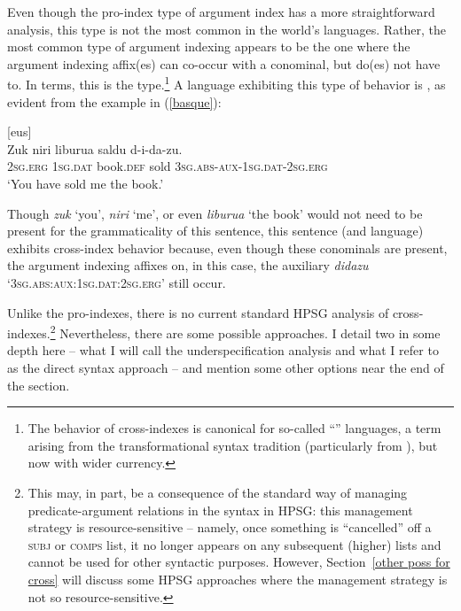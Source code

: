 \documentclass[output=paper
 	        ,biblatex
                ,babelshorthands
                ,newtxmath
                ,draftmode
                ,colorlinks, citecolor=brown
]{langscibook}
\begin{document}
Even though the pro-index type of argument index has a more straightforward analysis, this type is
not the most common in the world's languages. Rather, the most common type of argument indexing
appears to be the one where the argument indexing affix(es) can co-occur with a conominal, but
do(es) not have to.  In 
terms, this is the  type.\footnote{The behavior of cross-indexes is canonical for so-called ``'' languages, a term arising from the transformational syntax tradition (particularly from \citealt[, Section~4.3]{Chomsky81a}), but now with wider currency.} A language exhibiting this type of behavior is , as evident from the example in (\ref{basque}):    
%
\begin{samepage}
\begin{exe}
\ex\label{basque}  [eus] \citep[98]{laka96} \\
\gll Zuk niri liburua saldu d-i-da-zu. \\
\textsc{2sg.erg} \textsc{1sg.dat} book.\textsc{def} sold \textsc{3sg.abs}-\textsc{aux}-\textsc{1sg.dat}-\textsc{2sg.erg} \\
\glt `You have sold me the book.' 
\end{exe} 
\end{samepage}
%
Though \textit{zuk} `you', \textit{niri} `me', or even \textit{liburua}  `the book' would not need to be present for the grammaticality of this sentence, this sentence (and language) exhibits cross-index behavior because, even though these conominals are present, the argument indexing affixes on, in this case, the auxiliary \textit{didazu} `\textsc{3sg.abs}:\-\textsc{aux}:\-\textsc{1sg.dat}:\-\textsc{2sg.erg}' still occur. 

Unlike the pro-indexes, there is no current standard HPSG analysis of cross-indexes.\footnote{This may, in part, be a consequence of the standard way of managing predicate-argument relations in the syntax in HPSG: this management strategy is resource-sensitive -- namely, once something is ``cancelled'' off a \textsc{subj} or \textsc{comps} list, it no longer appears on any subsequent (higher) lists and cannot be used for other syntactic purposes. However, Section~\ref{other poss for cross} will discuss some HPSG approaches where the management strategy is not so resource-sensitive.} Nevertheless, there are some possible approaches. I detail two in some depth here -- what I will call the underspecification analysis and what I refer to as the direct syntax approach -- and mention some other options near the end of the section.
\end{document}
